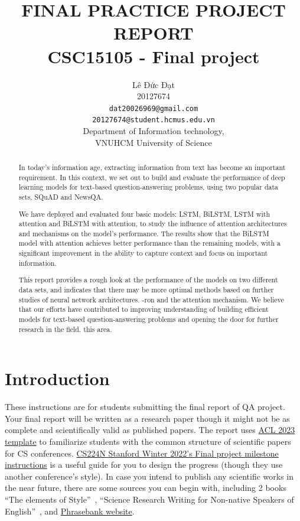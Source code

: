 \documentclass[11pt]{article}
\title{FINAL PRACTICE PROJECT REPORT \\
  \vspace{1em}
  \small{\normalfont CSC15105 - Final project}
}
\author{
    Lê Đức Đạt \\
    20127674 \\
    \texttt{dat20026969@gmail.com} \\
    \texttt{20127674@student.hcmus.edu.vn} \\
    Department of Information technology,\\ VNUHCM University of Science \\
}
\begin{document}
\maketitle

\begin{abstract}
In today's information age, extracting information from text has become an important requirement. In this context, we set out to build and evaluate the performance of deep learning models for text-based question-answering problems, using two popular data sets, SQuAD and NewsQA.

We have deployed and evaluated four basic models: LSTM, BiLSTM, LSTM with attention and BiLSTM with attention, to study the influence of attention architectures and mechanisms on the model's performance. The results show that the BiLSTM model with attention achieves better performance than the remaining models, with a significant improvement in the ability to capture context and focus on important information.

This report provides a rough look at the performance of the models on two different data sets, and indicates that there may be more optimal methods based on further studies of neural network architectures. -ron and the attention mechanism. We believe that our efforts have contributed to improving understanding of building efficient models for text-based question-answering problems and opening the door for further research in the field. this area.
\end{abstract}

\section{Introduction}
These instructions are for students submitting the final report of QA project.
Your final report will be written as a research paper though it might not be as complete and scientifically valid as published papers.
The report uses \href{https://2023.aclweb.org/calls/style_and_formatting/}{ACL 2023 template} to familiarize students with the common structure of scientific papers for CS conferences.
\href{http://web.stanford.edu/class/cs224n/project/CS224N_Final_Project_Milestone_Instructions.pdf}{CS224N Stanford Winter 2022's Final project milestone instructions} is a useful guide for you to design the progress (though they use another conference's style).
In case you intend to publish any scientific works in the near future, there are some sources you can begin with, including 2 books ``The elements of Style''~\citep{strunk2000elements}, ``Science Research Writing for Non-native Speakers of English''~\citep{glasman2010science}, and \href{https://www.phrasebank.manchester.ac.uk/introducing-work/}{Phrasebank website}.
\end{document}
